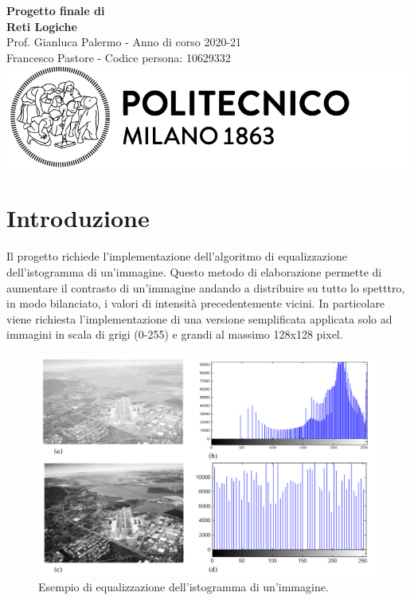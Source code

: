 \documentclass{article}
\begin{document}
\begin{titlepage}
    \centering
    \vspace*{\fill}
    \Huge\textbf{Progetto finale di \\ Reti Logiche}\\
    \vspace{5mm} %
    \Large Prof. Gianluca Palermo - Anno di corso 2020-21\\
    \vspace{5mm} %
    \large Francesco Pastore - Codice persona: 10629332\\
    \vspace{100mm}
    \includegraphics[scale=0.7]{logo.png}
    \vspace*{\fill}
\end{titlepage}

\thispagestyle{empty}
\tableofcontents
\pagebreak
\section{Introduzione}
Il progetto richiede l'implementazione dell'algoritmo di equalizzazione dell'istogramma di un'immagine. Questo metodo di elaborazione permette di aumentare il contrasto di un'immagine andando a distribuire su tutto lo spetttro, in modo bilanciato, i valori di intensità precedentemente vicini. In particolare viene richiesta l'implementazione di una versione semplificata applicata solo ad immagini in scala di grigi (0-255) e grandi al massimo 128x128 pixel.

\begin{figure}[h]
    \includegraphics[width=\textwidth]{equalization.png}
    \centering
    \caption{Esempio di equalizzazione dell'istogramma di un'immagine. \cite{equalization}}
\end{figure}
\end{document}

